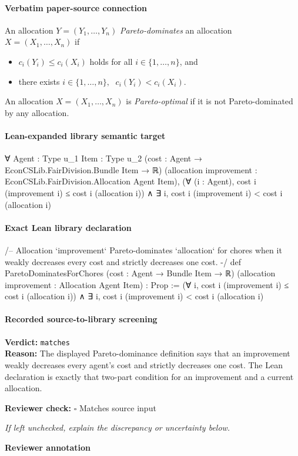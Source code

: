 \documentclass[10pt]{article}
\newcommand{\reviewerbox}{%
  \par\noindent\fbox{\parbox{0.96\linewidth}{\rule{0pt}{0.38in}}}\par
}
\newcommand{\reviewmatch}[1]{%
  \par\noindent\textbf{Reviewer check:} $\square$\; #1\par
  \noindent\emph{If left unchecked, explain the discrepancy or uncertainty below.}\par
}
\begin{document}
\paragraph{Verbatim paper-source connection}
\begin{ReviewVerbatim}
\begin{definition}
    An allocation $Y=(Y_1,\ldots,Y_n)$ \emph{Pareto-dominates} an allocation $X=(X_1,\ldots,X_n)$ if
    \begin{itemize}
        \item $c_i(Y_i)\leq c_i(X_i)$ holds for all $i\in\{1,\ldots,n\}$, and
        \item there exists $i\in\{1,\ldots,n\},\;$ $c_i(Y_i)<c_i(X_i)$.
    \end{itemize}
    An allocation $X=(X_1,\ldots,X_n)$ is \emph{Pareto-optimal} if it is not Pareto-dominated by any allocation.
\end{definition}
\end{ReviewVerbatim}

\paragraph{Lean-expanded library semantic target}
\begin{ReviewVerbatim}
∀ {Agent : Type u_1} {Item : Type u_2} (cost : Agent → EconCSLib.FairDivision.Bundle Item → ℝ)
  (allocation improvement : EconCSLib.FairDivision.Allocation Agent Item),
  (∀ (i : Agent), cost i (improvement i) ≤ cost i (allocation i)) ∧ ∃ i, cost i (improvement i) < cost i (allocation i)
\end{ReviewVerbatim}

\paragraph{Exact Lean library declaration}
\begin{ReviewVerbatim}
/-- Allocation `improvement` Pareto-dominates `allocation` for chores when it
weakly decreases every cost and strictly decreases one cost. -/
def ParetoDominatesForChores (cost : Agent → Bundle Item → ℝ)
    (allocation improvement : Allocation Agent Item) : Prop :=
  (∀ i, cost i (improvement i) ≤ cost i (allocation i)) ∧
    ∃ i, cost i (improvement i) < cost i (allocation i)
\end{ReviewVerbatim}

\paragraph{Recorded source-to-library screening}
\textbf{Verdict:} \texttt{matches}
\\
\textbf{Reason:} The displayed Pareto-dominance definition says that an improvement weakly decreases every agent's cost and strictly decreases one cost. The Lean declaration is exactly that two-part condition for an improvement and a current allocation.
\reviewmatch{Matches source input}
\noindent\textbf{Reviewer annotation}\par
\reviewerbox
\clearpage
\hypertarget{library-prerequisite-e50910ae4c5f1487}{}
\end{document}
